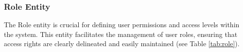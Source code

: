 	
%	
%		
%		
%		
%		
%	
	
	
	
	\subsubsection{Role Entity}
	The Role entity is crucial for defining user permissions and access levels within the system. This entity facilitates the management of user roles, ensuring that access rights are clearly delineated and easily maintained (see Table \ref{tab:role}).
	
